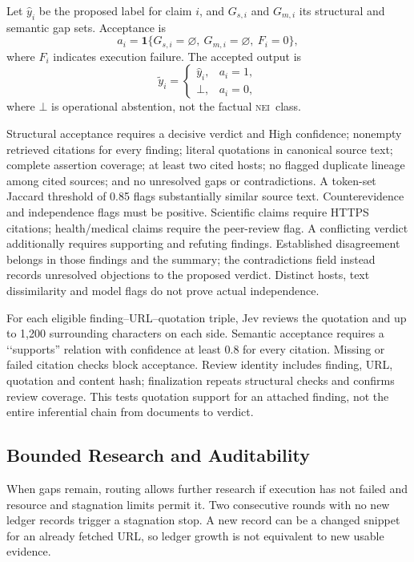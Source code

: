 \documentclass[conference]{IEEEtran}
\newcommand{\NEI}{\textsc{nei}}
\begin{document}
Let $\hat y_i$ be the proposed label for claim $i$, and $G_{s,i}$ and $G_{m,i}$ its structural and semantic gap sets. Acceptance is
\begin{equation}
a_i=\mathbf{1}\{G_{s,i}=\varnothing,\ G_{m,i}=\varnothing,\ F_i=0\},
\label{eq:acceptance}
\end{equation}
where $F_i$ indicates execution failure. The accepted output is
\begin{equation}
\tilde y_i =
\begin{cases}
\hat y_i, & a_i=1,\\
\bot, & a_i=0,
\end{cases}
\label{eq:selective}
\end{equation}
where $\bot$ is operational abstention, not the factual \NEI\ class.

Structural acceptance requires a decisive verdict and High confidence; nonempty retrieved citations for every finding; literal quotations in canonical source text; complete assertion coverage; at least two cited hosts; no flagged duplicate lineage among cited sources; and no unresolved gaps or contradictions. A token-set Jaccard threshold of 0.85 flags substantially similar source text. Counterevidence and independence flags must be positive. Scientific claims require HTTPS citations; health/medical claims require the peer-review flag. A conflicting verdict additionally requires supporting and refuting findings. Established disagreement belongs in those findings and the summary; the contradictions field instead records unresolved objections to the proposed verdict. Distinct hosts, text dissimilarity and model flags do not prove actual independence.

For each eligible finding--URL--quotation triple, Jev reviews the quotation and up to 1,200 surrounding characters on each side. Semantic acceptance requires a \lq\lq supports'' relation with confidence at least 0.8 for every citation. Missing or failed citation checks block acceptance. Review identity includes finding, URL, quotation and content hash; finalization repeats structural checks and confirms review coverage. This tests quotation support for an attached finding, not the entire inferential chain from documents to verdict.

\subsection{Bounded Research and Auditability}
When gaps remain, routing allows further research if execution has not failed and resource and stagnation limits permit it. Two consecutive rounds with no new ledger records trigger a stagnation stop. A new record can be a changed snippet for an already fetched URL, so ledger growth is not equivalent to new usable evidence.
\end{document}
